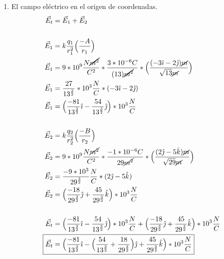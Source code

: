 \documentclass[12pt, twoside]{article}
\begin{document}
\begin{enumerate}
\begin{enumerate}
			\item El campo eléctrico en el origen de coordenadas.
				\begin{align*}
					\vec{E}_t &= \vec{E}_1 + \vec{E}_2\\
					\\
					\vec{E}_1 &= k \frac{q_1}{r_1^2}
					\Big{(}\frac{-A}{r_1}\Big{)}\\
					\vec{E}_1 &= 9*10^{9} \frac{N\cancel{\cancel{m^2}} }{C^2}*
					\frac{3*10^{-6}C}{(13)\cancel{\cancel{m^2} }}*
					\Big{(} \frac{(-3\hat{\imath}-2\hat{\jmath})\cancel{m}}{\sqrt{13}\cancel{m}} \Big{)}\\
					\vec{E}_1 &= \frac{27}{13^{ \frac{3}{2} }}*10^3\frac{N}{C}*
					(-3\hat{\imath}-2\hat{\jmath} )\\
					\vec{E}_1 &= \Big{(}
					\frac{-81}{13^{ \frac{3}{2} }}\hat{\imath}-
					\frac{54}{13^{ \frac{3}{2} }} \hat{\jmath}
					\Big{)}*10^3 \frac{N}{C}\\
					\\
					\vec{E}_2 &= k \frac{q_2}{r^2_2} \Big{(} \frac{-B}{r_2} \Big{)}\\
					\vec{E}_2 &= 9*10^9 \frac{N\cancel{m^2}}{C^2}*
					\frac{-1*10^{-6}C}{29\cancel{m^2}}*
					\Big{(} \frac{(2\hat{\jmath}-5\hat{k})\cancel{m}}{\sqrt{29}\cancel{m}} \Big{)}\\
					\vec{E}_2 &= \frac{-9*10^3}{29^{ \frac{3}{2} }}  \frac{N}{C}*
					(2\hat{\jmath}-5\hat{k})\\
					\vec{E}_2 &= \Big{(}
					\frac{-18}{29^{ \frac{3}{2} }}\hat{\jmath}+
					\frac{45}{29^{ \frac{3}{2} }}\hat{k}
					\Big{)}*10^3\frac{N}{C}\\
					\\
					\vec{E}_t &=  \Big{(}
					\frac{-81}{13^{ \frac{3}{2} }}\hat{\imath}-
					\frac{54}{13^{ \frac{3}{2} }} \hat{\jmath}
					\Big{)}*10^3\frac{N}{C}+
					\Big{(} \frac{-18}{29^{ \frac{3}{2} }}\hat{\jmath}+
					\frac{45}{29^{ \frac{3}{2} }}\hat{k}
					\Big{)}*10^3\frac{N}{C}\\
					\Aboxed{
						\vec{E}_t &= \Big{(}
						\frac{-81}{13^{ \frac{3}{2} }}\hat{\imath}-
						\Big{(} \frac{54}{13^{ \frac{3}{2} }}+
						\frac{18}{29^{ \frac{3}{2} }}
						\Big{)}\hat{\jmath}+
						\frac{45}{29^{ \frac{3}{2} }}\hat{k}
						\Big{)}*10^3 \frac{N}{C}
					}
				\end{align*}


\end{enumerate}
\end{enumerate}
\end{document}
